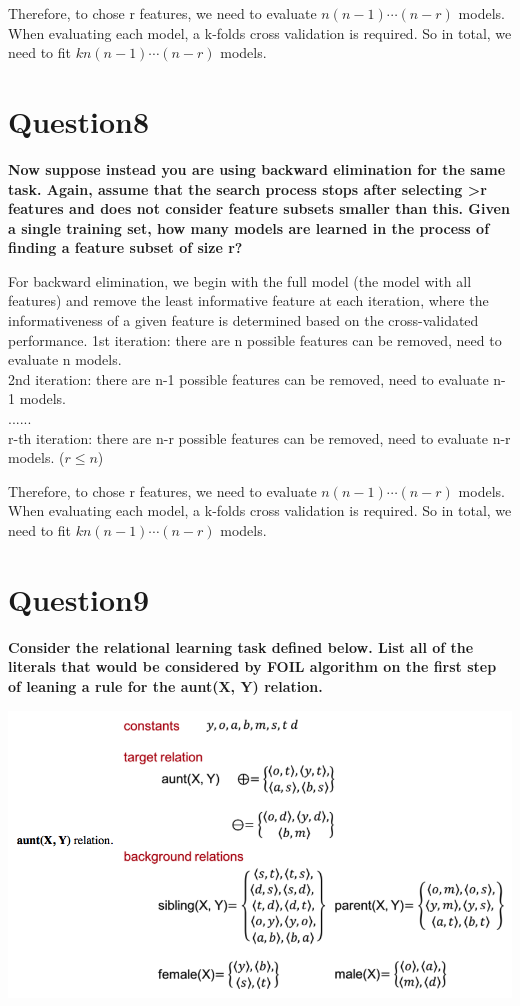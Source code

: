 \documentclass[paper=a4, fontsize=11pt]{scrartcl} %
\numberwithin{equation}{section} %
\numberwithin{figure}{section} %
\numberwithin{table}{section} %
\begin{document}
Therefore, to chose r features, we need to evaluate $n (n-1) \cdots (n-r) $ models. \\

When evaluating each model, a k-folds cross validation is required. So in total, we need to fit $kn (n-1) \cdots (n-r)$ models. 

\newpage
\section*{Question8}
\textbf{Now suppose instead you are using backward elimination for the same task. Again, assume that the search process stops after selecting >r features and does not consider feature subsets smaller than this. Given a single training set, how many models are learned in the process of finding a feature subset of size r?}

For backward elimination, we begin with the full model (the model with all features) and remove the least informative feature at each iteration, where the informativeness of a given feature is determined based on the cross-validated performance. 
\bigbreak
1st iteration: there are n possible features can be removed, need to evaluate n models. \\
2nd iteration: there are n-1 possible features can be removed, need to evaluate n-1 models. \\
......\\
r-th iteration: there are n-r possible features can be removed, need to evaluate n-r models. ($r \leq n$)
\bigbreak

Therefore, to chose r features, we need to evaluate $n (n-1) \cdots (n-r) $ models. \\

When evaluating each model, a k-folds cross validation is required. So in total, we need to fit $kn (n-1) \cdots (n-r)$ models. 



\newpage
\section*{Question9}
\textbf{Consider the relational learning task defined below. List all of the literals that would be considered by FOIL algorithm on the first step of leaning a rule for the aunt(X, Y) relation. }
\begin{center}
	\includegraphics[scale=.4]{pics/hw5_9.png}
\end{center}
\end{document}
